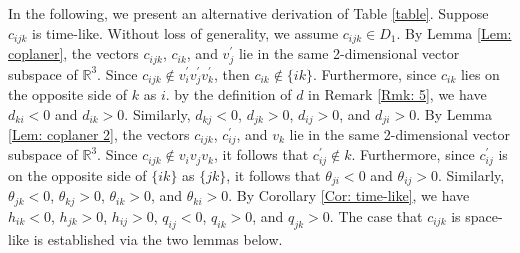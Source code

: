 \documentclass[12pt]{amsart}
\theoremstyle{definition}
\begin{document}
\begin{table}[ht!]
\caption{Relationships between the position of $c_{ijk}$ and the signs of $h$ and $q$}
\label{table}
\end{table}

In the following, we present an alternative derivation of Table \ref{table}.
Suppose $c_{ijk}$ is time-like.
Without loss of generality, we assume $c_{ijk}\in D_1$.
By Lemma \ref{Lem: coplaner}, the vectors $c_{ijk}$, $c_{ik}$, and $v^\prime_j$ lie in the same 2-dimensional vector subspace of $\mathbb{R}^3$.
Since $c_{ijk}\notin v^\prime_iv^\prime_jv^\prime_k$,
then $c_{ik}\notin \{ik\}$.
Furthermore, since $c_{ik}$ lies on the opposite side of $k$ as $i$.
by the definition of $d$ in Remark \ref{Rmk: 5},
we have $d_{ki}<0$ and $d_{ik}>0$.
Similarly, $d_{kj}<0$, $d_{jk}>0$, $d_{ij}>0$, and $d_{ji}>0$.
By Lemma \ref{Lem: coplaner 2},
the vectors $c_{ijk}$, $c^\prime_{ij}$, and $v_k$ lie in the same 2-dimensional vector subspace of $\mathbb{R}^3$.
Since $c_{ijk}\notin v_iv_jv_k$, it follows that $c^\prime_{ij}\notin k$.
Furthermore, since $c^\prime_{ij}$ is on the opposite side of $\{ik\}$ as $\{jk\}$, it follows that $\theta_{ji}<0$ and $\theta_{ij}>0$.
Similarly, $\theta_{jk}<0$, $\theta_{kj}>0$, $\theta_{ik}>0$, and $\theta_{ki}>0$.
By Corollary \ref{Cor: time-like}, we have $h_{ik}<0$, $h_{jk}>0$, $h_{ij}>0$, $q_{ij}<0$, $q_{ik}>0$, and $q_{jk}>0$.
The case that $c_{ijk}$ is space-like is established via the two lemmas below.
\end{document}
